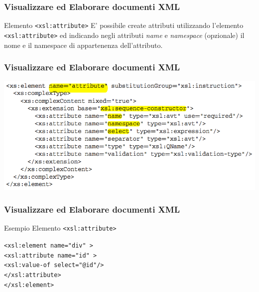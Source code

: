 
\begin{frame}
    \frametitle{Visualizzare ed Elaborare documenti XML}
    \addtocounter{nframe}{1}
    

     \begin{block}{Elemento \texttt{<xsl:attribute>}}
        E' possibile create attributi utilizzando l’elemento \texttt{<xsl:attribute>} ed indicando negli attributi \textit{name} e \textit{namespace} (opzionale) il nome e il namespace di appartenenza dell’attributo.
     \end{block}

\end{frame}

\begin{frame}
    \frametitle{Visualizzare ed Elaborare documenti XML}
    \addtocounter{nframe}{1}
    
    \begin{center}
        \includegraphics[width=.9\textwidth]{imgs/Schema-attributo.png}
    \end{center}

\end{frame}


\begin{frame}
    \frametitle{Visualizzare ed Elaborare documenti XML}
    \addtocounter{nframe}{1}
    

     \begin{block}{Esempio Elemento \texttt{<xsl:attribute>}}
        
        \texttt{<xsl:element name="div" >}
        \\\texttt{<xsl:attribute name="id" >}
        \\\texttt{<xsl:value-of select="@id"/>}
        \\\texttt{</xsl:attribute>}
        \\\texttt{</xsl:element>}

     \end{block}
\end{frame}


